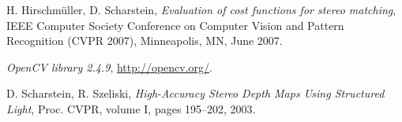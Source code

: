 \documentclass[12pt]{report}
\begin{document}
\begin{thebibliography}{1}
		H. Hirschmüller, D. Scharstein,
		\emph{Evaluation of cost functions for stereo matching},
		IEEE Computer Society Conference on Computer Vision and Pattern Recognition (CVPR 2007), Minneapolis, MN, June 2007.
		
		\emph{OpenCV library 2.4.9},
		\url{http://opencv.org/}.
		
		D. Scharstein, R. Szeliski,
		\emph{High-Accuracy Stereo Depth Maps Using Structured Light},
		Proc. CVPR, volume I, pages 195–202, 2003.
		
		


		
	\end{thebibliography}
\end{document}
